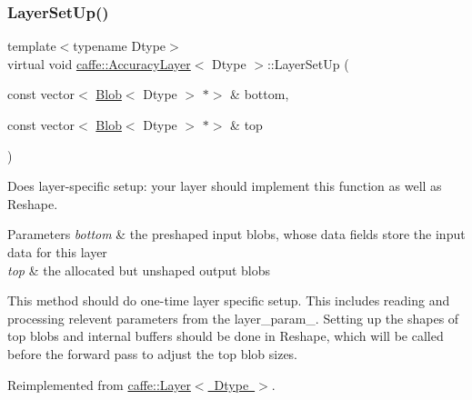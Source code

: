 \mbox{\label{classcaffe_1_1_accuracy_layer_a894a1fcb58e8f822f9d875e1acae560c}} 
\subsubsection{\texorpdfstring{Layer\+Set\+Up()}{LayerSetUp()}\hspace{0.1cm}{\footnotesize\ttfamily [2/2]}}
{\footnotesize\ttfamily template$<$typename Dtype$>$ \\
virtual void \mbox{\hyperlink{classcaffe_1_1_accuracy_layer}{caffe\+::\+Accuracy\+Layer}}$<$ Dtype $>$\+::Layer\+Set\+Up (\begin{DoxyParamCaption}\item[{const vector$<$ \mbox{\hyperlink{classcaffe_1_1_blob}{Blob}}$<$ Dtype $>$ $\ast$$>$ \&}]{bottom,  }\item[{const vector$<$ \mbox{\hyperlink{classcaffe_1_1_blob}{Blob}}$<$ Dtype $>$ $\ast$$>$ \&}]{top }\end{DoxyParamCaption})\hspace{0.3cm}{\ttfamily [virtual]}}



Does layer-\/specific setup\+: your layer should implement this function as well as Reshape. 


\begin{DoxyParams}{Parameters}
{\em bottom} & the preshaped input blobs, whose data fields store the input data for this layer \\
\hline
{\em top} & the allocated but unshaped output blobs\\
\hline
\end{DoxyParams}
This method should do one-\/time layer specific setup. This includes reading and processing relevent parameters from the {\ttfamily layer\+\_\+param\+\_\+}. Setting up the shapes of top blobs and internal buffers should be done in {\ttfamily Reshape}, which will be called before the forward pass to adjust the top blob sizes. 

Reimplemented from \mbox{\hyperlink{classcaffe_1_1_layer_a481323a3e0972c682787f2137468c29f}{caffe\+::\+Layer$<$ Dtype $>$}}.

\mbox{\label{classcaffe_1_1_accuracy_layer_a7591ae6d50dd7d96b91241b5b0368997}} 
